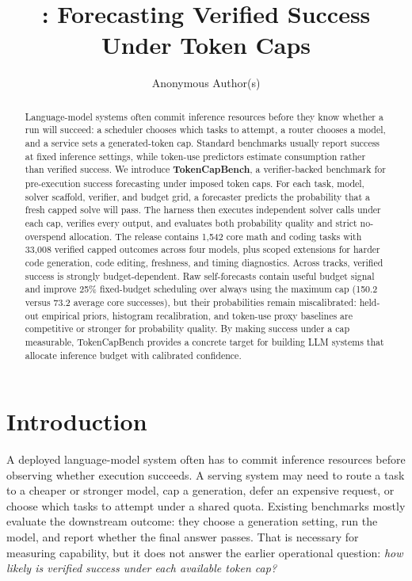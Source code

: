 \documentclass{article}
\title{\bench: Forecasting Verified Success Under Token Caps}
\author{Anonymous Author(s)}
\begin{document}
\maketitle

\begin{abstract}
Language-model systems often commit inference resources before they know whether a run will succeed: a scheduler chooses which tasks to attempt, a router chooses a model, and a service sets a generated-token cap. Standard benchmarks usually report success at fixed inference settings, while token-use predictors estimate consumption rather than verified success. We introduce \textbf{TokenCapBench}, a verifier-backed benchmark for pre-execution success forecasting under imposed token caps. For each task, model, solver scaffold, verifier, and budget grid, a forecaster predicts the probability that a fresh capped solve will pass. The harness then executes independent solver calls under each cap, verifies every output, and evaluates both probability quality and strict no-overspend allocation. The release contains 1,542 core math and coding tasks with 33,008 verified capped outcomes across four models, plus scoped extensions for harder code generation, code editing, freshness, and timing diagnostics. Across tracks, verified success is strongly budget-dependent. Raw self-forecasts contain useful budget signal and improve 25\% fixed-budget scheduling over always using the maximum cap (150.2 versus 73.2 average core successes), but their probabilities remain miscalibrated: held-out empirical priors, histogram recalibration, and token-use proxy baselines are competitive or stronger for probability quality. By making success under a cap measurable, TokenCapBench provides a concrete target for building LLM systems that allocate inference budget with calibrated confidence.
\end{abstract}

\section{Introduction}

A deployed language-model system often has to commit inference resources before observing whether execution succeeds. A serving system may need to route a task to a cheaper or stronger model, cap a generation, defer an expensive request, or choose which tasks to attempt under a shared quota. Existing benchmarks mostly evaluate the downstream outcome: they choose a generation setting, run the model, and report whether the final answer passes. That is necessary for measuring capability, but it does not answer the earlier operational question: \emph{how likely is verified success under each available token cap?}
\end{document}
